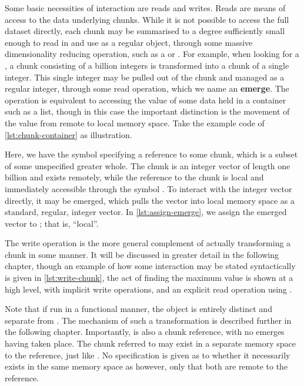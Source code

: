 Some basic necessities of interaction are reads and writes.
Reads are means of access to the data underlying chunks.
While it is not possible to access the full dataset directly, each chunk may be summarised to a degree sufficiently small enough to read in and use as a regular object, through some massive dimensionality reducing operation, such as a  or .
For example, when looking for a , a chunk consisting of a billion integers is transformed into a chunk of a single integer.
This single integer may be pulled out of the chunk and managed as a regular integer, through some read operation, which we name an \textbf{emerge}.
The operation is equivalent to accessing the value of some data held in a container such as a list, though in this case the important distinction is the movement of the value from remote to local memory space.
Take the example code of \cref{lst:chunk-container} as illustration.


Here, we have the symbol  specifying a reference to some chunk, which is a subset of some unspecified greater whole.
The chunk is an integer vector of length one billion and exists remotely, while the reference to the chunk is local and immediately accessible through the symbol .
To interact with the integer vector directly, it may be emerged, which pulls the vector into local memory space as a standard, regular, integer vector.
In \cref{lst:assign-emerge}, we assign the emerged vector to ; that is, ``local''.


The write operation is the more general complement of actually transforming a chunk in some manner.
It will be discussed in greater detail in the following chapter, though an example of how some interaction may be stated syntactically is given in \cref{lst:write-chunk}, the act of finding the maximum value is shown at a high level, with implicit write operations, and an explicit read operation using .


Note that if run in a functional manner, the object  is entirely distinct and separate from .
The mechanism of such a transformation is described further in the following chapter.
Importantly,  is also a chunk reference, with no emerges having taken place.
The chunk referred to may exist in a separate memory space to the reference, just like .
No specification is given as to whether it necessarily exists in the same memory space as  however, only that both are remote to the reference.

